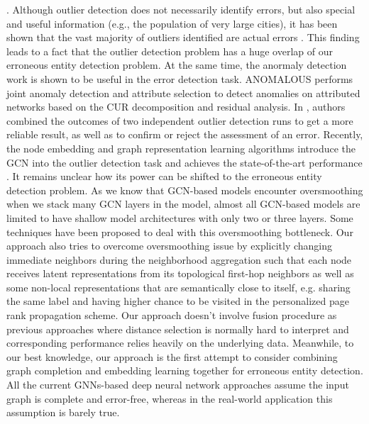 .
Although outlier detection does
not necessarily identify errors, but also special and useful information
(e.g., the population of very large cities), it has been
shown that the vast majority of outliers identified are
actual errors \cite{fleischhacker2014detecting}. This finding leads to a fact that the outlier detection problem has a huge overlap of our erroneous entity detection problem. At the same time, the anormaly detection work is shown to be useful in the error detection task. ANOMALOUS \cite{peng2018anomalous} performs joint anomaly detection and attribute selection to detect anomalies on attributed networks based on the CUR decomposition and residual analysis.  In \cite{fleischhacker2014detecting}, authors combined the outcomes of two independent outlier detection runs to get
a more reliable result, as well as to confirm or reject the assessment of an error.  Recently, the node embedding and graph representation learning algorithms introduce the GCN into the outlier detection task and achieves the state-of-the-art performance \cite{ding2019deep,zhong2019graph}. It remains unclear how its power can be shifted to the erroneous entity detection problem. As we know that GCN-based models encounter oversmoothing when we stack many GCN layers in the model, almost all GCN-based models are limited to have shallow model architectures with only two or three layers. Some techniques have been proposed to deal with this oversmoothing bottleneck. 
Our approach also tries to overcome oversmoothing issue by explicitly changing immediate neighbors during the neighborhood aggregation such that each node receives latent representations from its topological first-hop neighbors as well as some non-local representations that are semantically close to itself, e.g. sharing the same label and having higher chance to be visited in the personalized page rank propagation scheme. Our approach doesn't involve fusion procedure as previous approaches \cite{kapoor2019mixhop,xu2018representation} where distance selection is normally hard to interpret and corresponding performance relies heavily on the underlying data. Meanwhile, to our best knowledge, our approach is the first attempt to consider combining graph completion and embedding learning together for erroneous entity detection. All the current GNNs-based deep neural network approaches assume the input graph is complete and error-free, whereas in the real-world application this assumption is barely true. 
